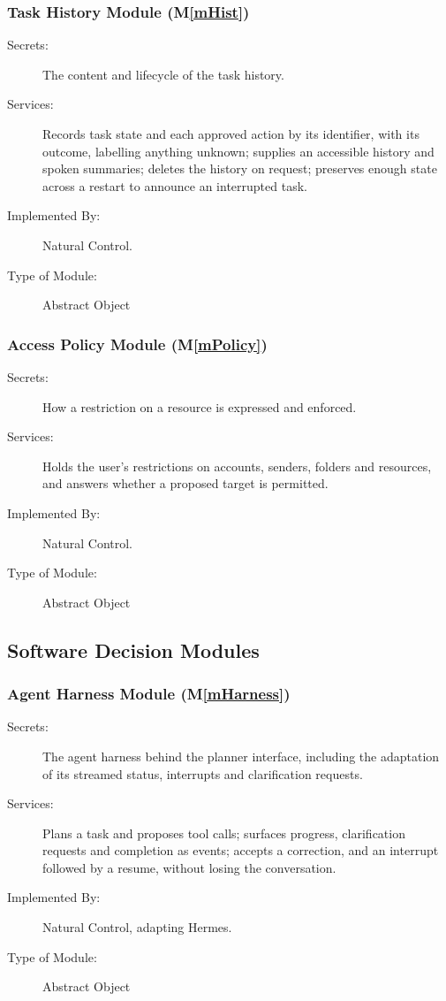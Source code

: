 \documentclass[12pt, titlepage]{article}
\newcommand{\progname}{Natural Control}
\newcommand{\mref}[1]{M\ref{#1}}
\begin{document}
\subsubsection{Task History Module (\mref{mHist})}
\begin{description}
\item[Secrets:] The content and lifecycle of the task history.
\item[Services:] Records task state and each approved action by its
identifier, with its outcome, labelling anything unknown; supplies an accessible history
and spoken summaries; deletes the history on request; preserves enough state
across a restart to announce an interrupted task.
\item[Implemented By:] \progname{}.
\item[Type of Module:] Abstract Object
\end{description}

\subsubsection{Access Policy Module (\mref{mPolicy})}
\begin{description}
\item[Secrets:] How a restriction on a resource is expressed and enforced.
\item[Services:] Holds the user's restrictions on accounts, senders, folders
and resources, and answers whether a proposed target is permitted.
\item[Implemented By:] \progname{}.
\item[Type of Module:] Abstract Object
\end{description}

\subsection{Software Decision Modules}

\subsubsection{Agent Harness Module (\mref{mHarness})}
\begin{description}
\item[Secrets:] The agent harness behind the planner interface, including the
adaptation of its streamed status, interrupts and clarification requests.
\item[Services:] Plans a task and proposes tool calls; surfaces progress,
clarification requests and completion as events; accepts a correction, and an
interrupt followed by a resume, without losing the conversation.
\item[Implemented By:] \progname{}, adapting Hermes.
\item[Type of Module:] Abstract Object
\end{description}
\end{document}
